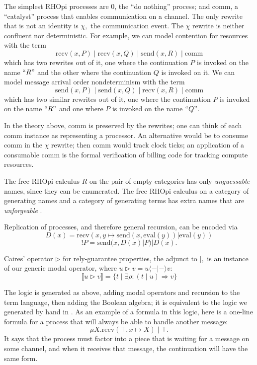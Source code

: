 \documentclass{llncs}
\newcommand{\interp}[1]{\llbracket #1 \rrbracket}
\newcommand{\maps}{\colon}
\newcommand{\send}{\mathrm{send}}
\newcommand{\recv}{\mathrm{recv}}
\newcommand{\comm}{\mathrm{comm}}
\renewcommand{\quote}[1]{``#1"}
\newcommand{\deref}[1]{\mathrm{eval}(#1)}
\begin{document}
The simplest RHOpi processes are 0, the ``do nothing'' process; and comm, a ``catalyst'' process that enables communication on a channel.  The only rewrite that is not an identity is $\chi,$ the communication event.  The $\chi$ rewrite is neither confluent nor deterministic.  For example, we can model contention for resources with the term
\[ \recv(x, P)\;|\;\recv(x, Q)\;|\;\send(x,R)\;|\;\comm \]
which has two rewrites out of it, one where the continuation $P$ is invoked on the name $\quote{R}$ and the other where the continuation $Q$ is invoked on it.  We can model message arrival order nondeterminism with the term
\[ \send(x, P)\;|\;\send(x, Q)\;|\;\recv(x,R)\;|\;\comm \]
which has two similar rewrites out of it, one where the continuation $P$ is invoked on the name $\quote{R}$ and one where $P$ is invoked on the name $\quote{Q}$.

In the theory above, comm is preserved by the rewrites; one can think of each comm instance as representing a processor.  An alternative would be to consume comm in the $\chi$ rewrite; then comm would track clock ticks; an application of a consumable comm is the formal verification of billing code for tracking compute resources.

The free RHOpi calculus $R$ on the pair of empty categories has only {\em unguessable} names, since they can be enumerated.  The free RHOpi calculus on a category of generating names and a category of generating terms has extra names that are {\em unforgeable} \cite{MillerYeeShapiro}.

Replication of processes, and therefore general recursion, can be encoded \cite{DBLP:journals/entcs/MeredithR05} via
\[D(x) = \recv(x, y\mapsto \send(x, \deref{y}) | \deref{y})\]
\[!P = \send(x, D(x) | P) | D(x).\]

Caires' \cite{Caires} operator $\triangleright$ for rely-guarantee properties, the adjunct to $|,$ is an instance of our generic modal operator, where $u \triangleright v = u \langle - | - \rangle v:$
\[ \interp{u \triangleright v} = \{ t \;|\; \exists \rho\maps (t\;|\;u) \Rightarrow v\} \]

The logic is generated as above, adding modal operators and recursion to the term language, then adding the Boolean algebra; it is equivalent to the logic we generated by hand in \cite{DBLP:conf/tgc/MeredithR05}.  As an example of a formula in this logic, here is a one-line formula for a process that will always be able to handle another message:
\[ \mu X. \recv(\top, x \mapsto X)\;|\;\top. \]
It says that the process must factor into a piece that is waiting for a message on some channel, and when it receives that message, the continuation will have the same form.
\end{document}

